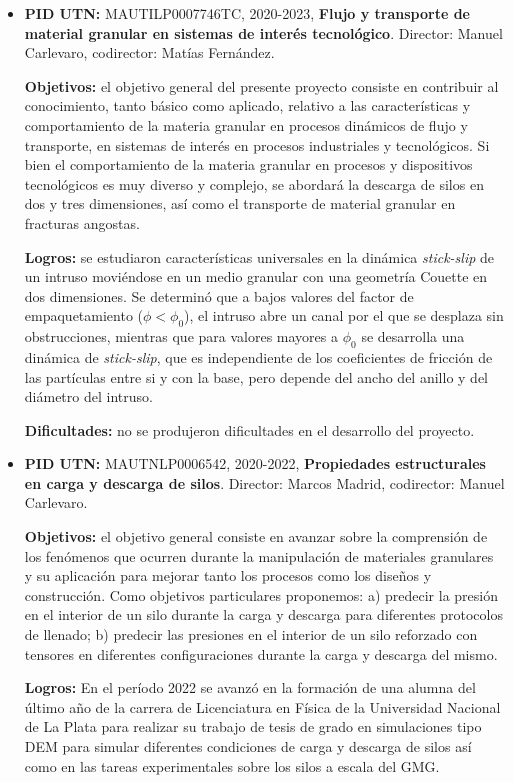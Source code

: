 \documentclass[a4paper,11pt,twoside,final,titlepage,onecolumn,openright]{report}
\begin{document}
\begin{itemize}
  
\item {\bf PID UTN:} MAUTILP0007746TC, 2020-2023, {\bf Flujo y transporte de material granular en sistemas de interés tecnológico}. Director: Manuel Carlevaro, codirector: Matías Fernández.
 
{\bf Objetivos:} el objetivo general del presente proyecto consiste en contribuir al conocimiento, tanto básico como aplicado, relativo a las características y comportamiento de la materia granular en procesos dinámicos de flujo y transporte, en sistemas de interés en procesos industriales y tecnológicos. Si bien el comportamiento de la materia granular en procesos y dispositivos tecnológicos es muy diverso y complejo, se abordará la descarga de silos en dos y tres dimensiones, así como el transporte de material granular en fracturas angostas.

 
{\bf Logros:} se estudiaron características universales en la dinámica \textit{stick-slip} de un intruso moviéndose en un medio granular con una geometría Couette en dos dimensiones. Se determinó que a bajos valores del factor de empaquetamiento ($\phi < \phi_0$), el intruso abre un canal por el que se desplaza sin obstrucciones, mientras que para valores mayores a $\phi_0$ se desarrolla una dinámica de \textit{stick-slip}, que es independiente de los coeficientes de fricción de las partículas entre si y con la base, pero depende del ancho del anillo y del diámetro del intruso.

 
 {\bf Dificultades:} no se produjeron dificultades en el desarrollo del proyecto. 
 
\item {\bf PID UTN:} MAUTNLP0006542, 2020-2022, {\bf Propiedades estructurales en carga y descarga de silos}. Director: Marcos Madrid, codirector: Manuel Carlevaro.
 
{\bf Objetivos:} el objetivo general consiste en avanzar sobre la comprensión de los fenómenos que ocurren durante la manipulación de materiales granulares y su aplicación para mejorar tanto los procesos como los diseños y construcción. Como objetivos particulares proponemos: a) predecir la presión en el interior de un silo durante la carga y descarga para diferentes protocolos de llenado; b) predecir las presiones en el interior de un silo reforzado con tensores en diferentes configuraciones durante la carga y descarga del mismo.

 {\bf Logros:} En el período 2022 se avanzó en la formación de una alumna del último año de la carrera de Licenciatura en Física de la Universidad Nacional de La Plata para realizar su trabajo de tesis de grado en simulaciones tipo DEM para simular diferentes condiciones de carga y descarga de silos así como en las tareas experimentales sobre los silos a escala del GMG. 
 

\end{itemize}
\end{document}
